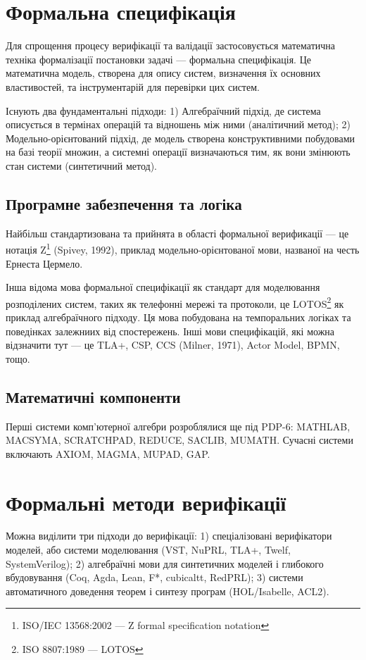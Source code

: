 \section{Формальна специфікація}

Для спрощення процесу верифікації та валідації застосовується математична техніка формалізації постановки задачі --- формальна специфікація. Це математична модель, створена для опису систем, визначення їх основних властивостей, та інструментарій для перевірки цих систем.

Існують два фундаментальні підходи:
1) Алгебраїчний підхід, де система описується в термінах операцій та відношень між ними (аналітичний метод);
2) Модельно-орієнтований підхід, де модель створена конструктивними побудовами на базі теорії множин, а системні операції визначаються тим, як вони змінюють стан системи (синтетичний метод).

\subsection{Програмне забезпечення та логіка}

Найбільш стандартизована та прийнята в області формальної верификації --- це нотація Z\footnote{ISO/IEC 13568:2002 --- Z formal specification notation} (Spivey, 1992), приклад модельно-орієнтованої мови, названої на честь Ернеста Цермело.

Інша відома мова формальної специфікації як стандарт для моделювання розподілених систем, таких як телефонні мережі та протоколи, це LOTOS\footnote{ISO 8807:1989 --- LOTOS} як приклад алгебраїчного підходу. Ця мова побудована на темпоральних логіках та поведінках залежниих від спостережень. Інші мови специфікацій, які можна відзначити тут --- це TLA+, CSP, CCS (Milner, 1971), Actor Model, BPMN, тощо.

\subsection{Математичні компоненти}
Перші системи комп'ютерної алгебри розроблялися ще під PDP-6: MATHLAB, MACSYMA, SCRATCHPAD, REDUCE, SACLIB, MUMATH. Сучасні системи включають AXIOM, MAGMA, MUPAD, GAP.

\section{Формальні методи верифікації}

Можна виділити три підходи до верифікації:
1) спеціалізовані верифікатори моделей, або системи моделювання (VST, NuPRL, TLA+, Twelf, SystemVerilog);
2) алгебраїчні мови для синтетичних моделей і глибокого вбудовування (Coq, Agda, Lean, F*, cubicaltt, RedPRL);
3) системи автоматичного доведення теорем і синтезу програм (HOL/Isabelle, ACL2).

